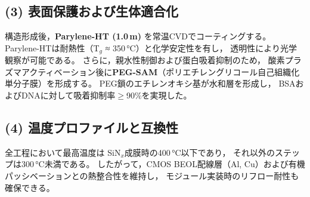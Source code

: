 \documentclass[conference]{IEEEtran}
\begin{document}
\subsection*{(3) 表面保護および生体適合化}
構造形成後，\textbf{Parylene-HT (1.0\,\textmu m)} を常温CVDでコーティングする。
Parylene-HTは耐熱性（T$_g$ ≈ 350\,\si{\celsius}）と化学安定性を有し，
透明性により光学観察が可能である。
さらに，親水性制御および蛋白吸着抑制のため，
酸素プラズマアクティベーション後に\textbf{PEG-SAM}（ポリエチレングリコール自己組織化単分子膜）を形成する。
PEG鎖のエチレンオキシ基が水和層を形成し，
BSAおよびDNAに対して吸着抑制率$\ge$90\%を実現した。

\subsection*{(4) 温度プロファイルと互換性}
全工程において最高温度は
SiN$_x$成膜時の400\,\si{\celsius}以下であり，
それ以外のステップは300\,\si{\celsius}未満である。
したがって，CMOS BEOL配線層（Al, Cu）および有機パッシベーションとの熱整合性を維持し，
モジュール実装時のリフロー耐性も確保できる。
\end{document}
